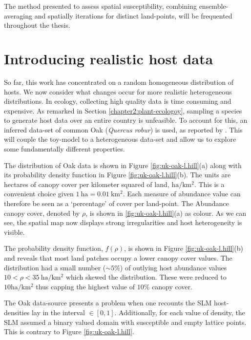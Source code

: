 The method presented to assess spatial susceptibility, combining ensemble-averaging and %
spatially iterations for distinct land-points, will be frequented throughout the thesis. %

\section{Introducing realistic host data}

So far, this work has concentrated on a random homogeneous distribution of hosts. %
We now consider what changes occur for more realistic heterogeneous distributions. %
In ecology, collecting high quality data is time consuming and expensive. %
As remarked in Section \ref{chapter2:plant-ecologoy}, sampling a species to generate host %
data over an entire country is unfeasible. %
To account for this, an inferred data-set of common Oak (\textit{Quercus robur}) is used, %
as reported by \cite{hill.data}. %
This will couple the toy-model to a heterogeneous data-set and allow us to explore some %
fundamentally different properties. %
 
The distribution of Oak data is shown in Figure \ref{fig:uk-oak-l.hill}(a) along with its 
probability density function in  Figure \ref{fig:uk-oak-l.hill}(b). %
The units are hectares of canopy cover per kilometer squared of land, $\mathrm{ha/km^{2}}$. %
This is a convenient choice given $\mathrm{1\ ha = 0.01\ km^2}$. Each measure of abundance %
value can therefore be seen as a `percentage' of cover per land-point. %
The Abundance canopy cover, denoted by $\rho$, is shown in \ref{fig:uk-oak-l.hill}(a) as colour. %
As we can see, the spatial map now displays strong irregularities and host heterogeneity is visible. %

The probability density function, $f(\rho)$, is shown in Figure \ref{fig:uk-oak-l.hill}(b) and %
reveals that most land patches occupy a lower canopy cover values. %
The distribution had a small number ($\sim 5\%$) of outlying host abundance values%
 $10<\rho<35\ \mathrm{ha/km^2}$ which skewed the distribution. %
 These were reduced to $10\mathrm{ha/km^2}$ thus capping the highest value of $10\%$ canopy cover. %
 
The Oak data-source presents a problem when one recounts the SLM host-densities lay in the %
interval $\in [0, 1]$. Additionally, for each value of density, the SLM  assumed a binary %
valued domain with susceptible and empty lattice points. %
This is contrary to Figure \ref{fig:uk-oak-l.hill}. %

